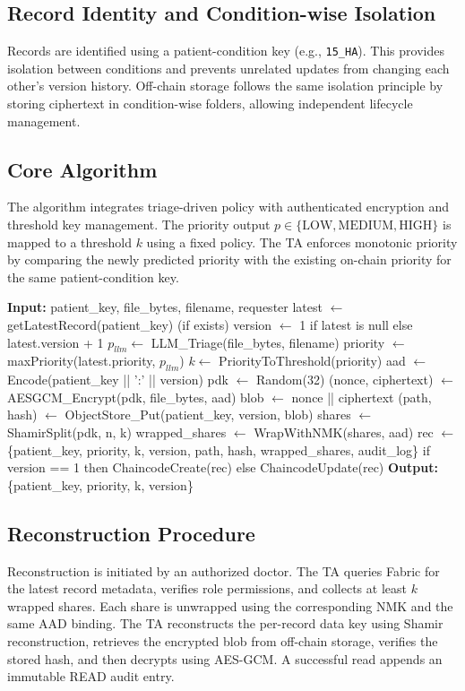 \documentclass{IEEEtran}
\begin{document}
\subsection{Record Identity and Condition-wise Isolation}
Records are identified using a patient-condition key (e.g., \texttt{15\_HA}). This provides isolation between conditions and prevents unrelated updates from changing each other’s version history. Off-chain storage follows the same isolation principle by storing ciphertext in condition-wise folders, allowing independent lifecycle management.

\subsection{Core Algorithm}
The algorithm integrates triage-driven policy with authenticated encryption and threshold key management. The priority output $p\in\{\mathrm{LOW},\mathrm{MEDIUM},\mathrm{HIGH}\}$ is mapped to a threshold $k$ using a fixed policy. The TA enforces monotonic priority by comparing the newly predicted priority with the existing on-chain priority for the same patient-condition key.

\begin{algorithmic}
\STATE \textbf{Input:} patient\_key, file\_bytes, filename, requester
\STATE latest $\leftarrow$ getLatestRecord(patient\_key) (if exists)
\STATE version $\leftarrow$ 1 if latest is null else latest.version + 1
\STATE $p_{llm} \leftarrow$ LLM\_Triage(file\_bytes, filename)
\STATE priority $\leftarrow$ maxPriority(latest.priority, $p_{llm}$)
\STATE $k \leftarrow$ PriorityToThreshold(priority)
\STATE aad $\leftarrow$ Encode(patient\_key || ':' || version)
\STATE pdk $\leftarrow$ Random(32)
\STATE (nonce, ciphertext) $\leftarrow$ AESGCM\_Encrypt(pdk, file\_bytes, aad)
\STATE blob $\leftarrow$ nonce || ciphertext
\STATE (path, hash) $\leftarrow$ ObjectStore\_Put(patient\_key, version, blob)
\STATE shares $\leftarrow$ ShamirSplit(pdk, n, k)
\STATE wrapped\_shares $\leftarrow$ WrapWithNMK(shares, aad)
\STATE rec $\leftarrow$ \{patient\_key, priority, k, version, path, hash, wrapped\_shares, audit\_log\}
\STATE if version == 1 then ChaincodeCreate(rec) else ChaincodeUpdate(rec)
\STATE \textbf{Output:} \{patient\_key, priority, k, version\}
\end{algorithmic}

\subsection{Reconstruction Procedure}
Reconstruction is initiated by an authorized doctor. The TA queries Fabric for the latest record metadata, verifies role permissions, and collects at least $k$ wrapped shares. Each share is unwrapped using the corresponding NMK and the same AAD binding. The TA reconstructs the per-record data key using Shamir reconstruction, retrieves the encrypted blob from off-chain storage, verifies the stored hash, and then decrypts using AES-GCM. A successful read appends an immutable READ audit entry.
\end{document}
